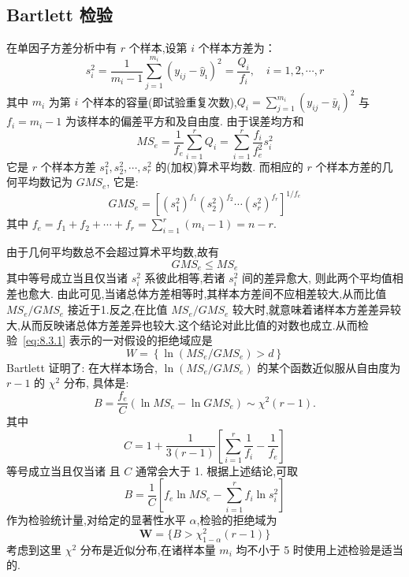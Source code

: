 \subsection{Bartlett 检验}
在单因子方差分析中有 $r$ 个样本,设第 $i$ 个样本方差为：
\begin{equation*}
  s_{i}^{2}=\frac{1}{m_{i}-1} \sum_{j=1}^{m_{i}}\left(y_{i j}-\hat{y}_{\imath}\right)^{2}=\frac{Q_{i}}{f_{i}}, \quad i=1,2, \cdots, r
\end{equation*}
其中 $m_i$ 为第 $i$ 个样本的容量(即试验重复次数),$Q_i = \sum_{j=1}^{m_i} (y_{ij} - \bar{y}_i)^2$ 与 $f_i =m_i -1$ 为该样本的偏差平方和及自由度. 由于误差均方和
\begin{equation*}
  M S_{e}=\frac{1}{f_{e}} \sum_{i=1}^{r} Q_{i}=\sum_{i=1}^{r} \frac{f_{i}}{f_{e}^{2}} s_{i}^{2}
\end{equation*}
它是 $r$ 个样本方差 $s_1^2,s_2^2, \cdots, s_r^2$ 的(加权)算术平均数. 而相应的 $r$ 个样本方差的几何平均数记为 $GMS_e$, 它是:
\begin{equation*}
  GMS_e = [(s_1^2)^{f_1}(s_2^2)^{f_2} \cdots (s_r^2)^{f_r}]^{1/f_e}
\end{equation*}
其中 $f_e = f_1 + f_2 + \cdots + f_r = \sum_{i=1}^r(m_i - 1) = n-r$.

由于几何平均数总不会超过算术平均数,故有
\begin{equation}
  GMS_e \leq MS_e
\end{equation}
其中等号成立当且仅当诸 $s_i^2$ 系彼此相等,若诸 $s_i^2$ 间的差异愈大, 则此两个平均值相差也愈大. 由此可见,当诸总体方差相等时,其样本方差间不应相差较大,从而比值 $MS_e/GMS_e$ 接近于1.反之,在比值 $MS_e/GMS_e$ 较大时,就意味着诸样本方差差异较大,从而反映诸总体方差差异也较大.这个结论对此比值的对数也成立.从而检验~\eqref{eq:8.3.1} 表示的一对假设的拒绝域应是
\begin{equation}\label{eq:8.3.4}
  W=\left\{\ln \left(M S_{e} / G M S_{e}\right)>d\right\}
\end{equation}
Bartlett 证明了: 在大样本场合, $\ln(MS_e/GMS_e)$ 的某个函数近似服从自由度为 $r-1$ 的 $\chi^2$ 分布, 具体是:
\begin{equation}\label{eq:8.3.5}
  B=\frac{f_{e}}{C}(\ln M S_{e}-\ln G M S_{e}) \sim \chi^{2}(r-1).
\end{equation}
其中
\begin{equation}\label{eq:8.3.6}
  C = 1 + \frac{1}{3(r-1)} \left[\sum_{i=1}^{r} \frac{1}{f_{i}}-\frac{1}{f_{e}}\right]
\end{equation}
等号成立当且仅当诸
且 $C$ 通常会大于 1. 根据上述结论,可取
\begin{equation}\label{eq:8.3.7}
  B=\frac{1}{C}\left[f_{e} \ln M S_{e}-\sum_{i=1}^{r} f_{i} \ln s_{i}^{2}\right]
\end{equation}
作为检验统计量,对给定的显著性水平 $\alpha$,检验的拒绝域为
\begin{equation}
  \boldsymbol{W}=\{ B>\chi_{1-\alpha}^{2}(r-1) \}
\end{equation}
考虑到这里 $\chi^2$ 分布是近似分布,在诸样本量 $m_i$ 均不小于 5 时使用上述检验是适当的.

